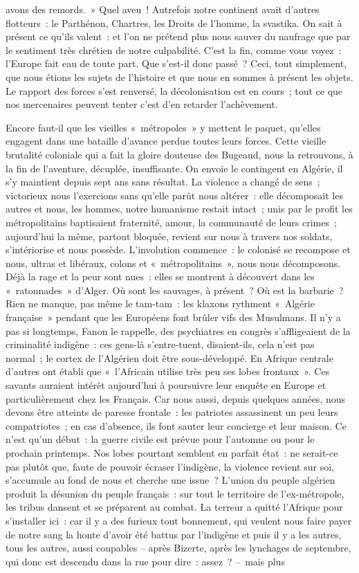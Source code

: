 \documentclass[french,twoside]{book} %
\begin{document}
avons des remords. » Quel aveu ! Autrefois notre continent avait d’autres flotteurs : le Parthénon, Chartres, les Droits de l’homme, la svastika. On sait à présent ce qu’ils valent : et l’on ne prétend plus nous sauver du naufrage que par le sentiment très chrétien de notre culpabilité. C’est la fin, comme vous voyez : l’Europe fait eau de toute part. Que s’est-il donc passé ? Ceci, tout simplement, que nous étions les sujets de l’histoire et que nous en sommes à présent les objets. Le rapport des forces s’est renversé, la décolonisation est en cours ; tout ce que nos mercenaires peuvent tenter c’est d’en retarder l’achèvement.\par
 Encore faut-il que les vieilles « métropoles » y mettent le paquet, qu’elles engagent dans une bataille d’avance perdue toutes leurs forces. Cette vieille brutalité coloniale qui a fait la gloire douteuse des Bugeaud, nous la retrouvons, à la fin de l’aventure, décuplée, insuffisante. On envoie le contingent en Algérie, il s’y maintient depuis sept ans sans résultat. La violence a changé de sens ; victorieux nous l’exercions sans qu’elle parût nous altérer : elle décomposait les autres et nous, les hommes, notre humanisme restait intact ; unis par le profit les métropolitains baptisaient fraternité, amour, la communauté de leurs crimes ; aujourd’hui la même, partout bloquée, revient sur nous à travers nos soldats, s’intériorise et nous possède. L’involution commence : le colonisé se recompose et nous, ultras et libéraux, colons et « métropolitains », nous nous décomposons. Déjà la rage et la peur sont nues : elles se montrent à découvert dans les « ratonnades » d’Alger. Où sont les sauvages, à présent ? Où est la barbarie ? Rien ne manque, pas même le tam-tam : les klaxons rythment « Algérie française » pendant que les Européens font brûler vifs des Musulmans. Il n’y a pas si longtemps, Fanon le rappelle, des psychiatres en congrès s’affligeaient de la criminalité indigène : ces gens-là s’entre-tuent, disaient-ils, cela n’est pas normal ; le cortex de l’Algérien doit être sous-développé. En Afrique centrale d’autres ont établi que « l’Africain utilise très peu ses lobes frontaux ». Ces savants auraient intérêt aujourd’hui à poursuivre leur enquête en Europe et particulièrement chez les Français. Car nous aussi, depuis quelques années, nous devons être atteints de paresse frontale : les patriotes assassinent un peu leurs compatriotes ; en cas d’absence, ils font sauter leur concierge et leur maison. Ce n’est qu’un début : la guerre civile est prévue pour l’automne ou pour le prochain printemps. Nos lobes pourtant semblent en parfait état : ne serait-ce pas plutôt que, faute de pouvoir écraser l’indigène, la violence revient sur soi, s’accumule au fond de nous et cherche une issue ? L’union du peuple algérien produit la désunion du peuple français : sur tout le territoire de l’ex-métropole, les tribus dansent et se préparent   au combat. La terreur a quitté l’Afrique pour s’installer ici : car il y a des furieux tout bonnement, qui veulent nous faire payer de notre sang la honte d’avoir été battus par l’indigène et puis il y a les autres, tous les autres, aussi coupables – après Bizerte, après les lynchages de septembre, qui donc est descendu dans la rue pour dire : assez ? – mais plus 
\end{document}
